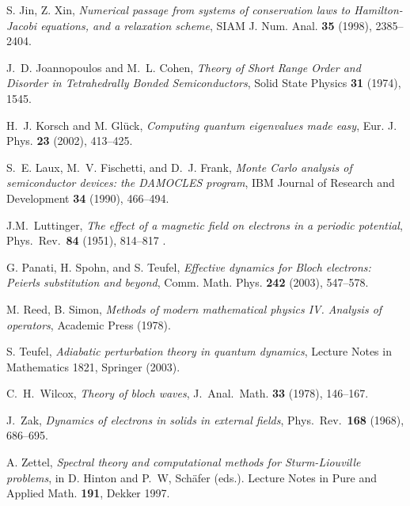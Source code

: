 \documentclass[leqno,final]{siamltex}
\numberwithin{equation}{section}
\newcounter{me}
\begin{document}
\begin{thebibliography}{99}
 S. Jin, Z. Xin, \emph{Numerical passage from systems of
conservation laws to Hamilton-Jacobi equations, and a relaxation
scheme}, SIAM J. Num. Anal. \textbf{35} (1998), 2385--2404.

 J.~D. Joannopoulos and M.~L. Cohen, \emph{Theory of
Short Range Order and Disorder in Tetrahedrally Bonded
Semiconductors}, Solid State Physics {\bf 31} (1974), 1545.

 H.~J. Korsch and M. Gl\"uck,
\emph{Computing quantum eigenvalues made easy}, Eur. J. Phys.
{\bf 23} (2002), 413--425.

 S.~E. Laux, M.~V. Fischetti, and D.~J. Frank,
\emph{Monte Carlo analysis of semiconductor devices: the DAMOCLES
program}, IBM Journal of Research and Development {\bf 34} (1990),
466--494.

  J.M.\ Luttinger, {\em The effect of a magnetic field
on electrons in a periodic potential},
Phys.\ Rev.\ {\bf 84} (1951), 814--817 .

 G. Panati, H. Spohn, and S. Teufel,
\emph{Effective dynamics for Bloch electrons: Peierls substitution
and beyond}, Comm. Math. Phys. \textbf{242} (2003), 547--578.

 M. Reed, B. Simon, \emph{Methods of modern mathematical
physics IV. Analysis of operators}, Academic Press (1978).

 S. Teufel, \emph{Adiabatic perturbation theory in quantum
dynamics}, Lecture Notes in Mathematics 1821, Springer (2003).

  C.\ H.\ Wilcox, {\em Theory of bloch waves},
J.\ Anal.\ Math. {\bf 33} (1978), 146--167.

 J.\ Zak, {\em Dynamics of electrons in solids in external
fields}, Phys.\ Rev.\ {\bf 168} (1968), 686--695.

 A. Zettel, \emph{Spectral theory and computational methods
for Sturm-Liouville problems}, in D. Hinton and P.~W, Sch\"afer
(eds.). Lecture Notes in Pure and Applied Math. {\bf 191}, Dekker
1997.
\end{thebibliography}
\end{document}
